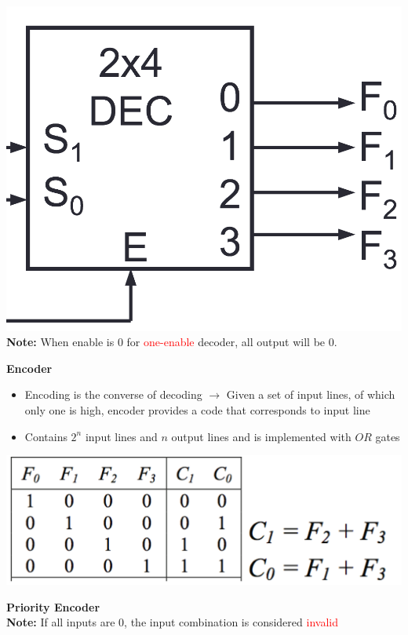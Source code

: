 \documentclass[a4paper]{article} \usepackage[backend=biber, style=numeric, sorting=none]{biblatex}
\begin{document}
\begin{multicols*}{4}
\begin{multicols*}{2}
\includegraphics[width=1\columnwidth]{decoder}
\textbf{Note:} When enable is 0 for \textcolor{red}{one-enable} decoder, all output will be 0.
\end{multicols*}

\begin{multicols*}{2}
\textbf{{Encoder}}
\begin{itemize}
    \item Encoding is the converse of decoding $\rightarrow$ Given a set of input lines, of which only one is high, encoder provides a code that corresponds to input line
    \item Contains $2^n$ input lines and $n$ output lines and is implemented with $OR$ gates
\end{itemize}
\columnbreak

\includegraphics[width=1\columnwidth]{encoder}

\end{multicols*}

\begin{multicols*}{2}
\textbf{{Priority Encoder}}\\
\textbf{Note:} If all inputs are 0, the input combination is considered \textcolor{red}{invalid}
\columnbreak


\end{multicols*}
\end{multicols*}
\end{document}

